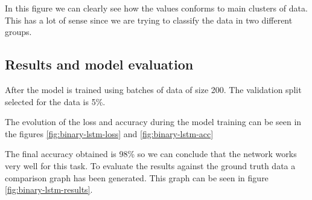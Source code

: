 In this figure we can clearly see how the values conforms to main clusters of data. This has a lot of sense since we are trying to classify the data in two different groups.



\subsection{Results and model evaluation}

After the model is trained using batches of data of size 200. The validation split selected for the data is 5\%.

The evolution of the loss and accuracy during the model training can be seen in the figures \ref{fig:binary-lstm-loss} and \ref{fig:binary-lstm-acc}

The final accuracy obtained is 98\% so we can conclude that the network works very well for this task. To evaluate the results against the ground truth data a comparison graph has been generated. This graph can be seen in figure \ref{fig:binary-lstm-results}.

%
%


